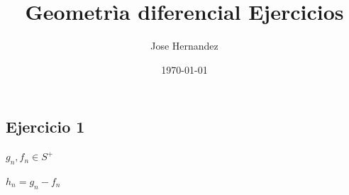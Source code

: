 \documentclass{article}
\title{Geometrìa diferencial Ejercicios}
\author{Jose Hernandez}
\date{\today}
\begin{document}
\maketitle

\subsection*{Ejercicio 1}

\( g_n, f_n \in S^+ \)

\( h_n = g_n - f_n \)
\end{document}

